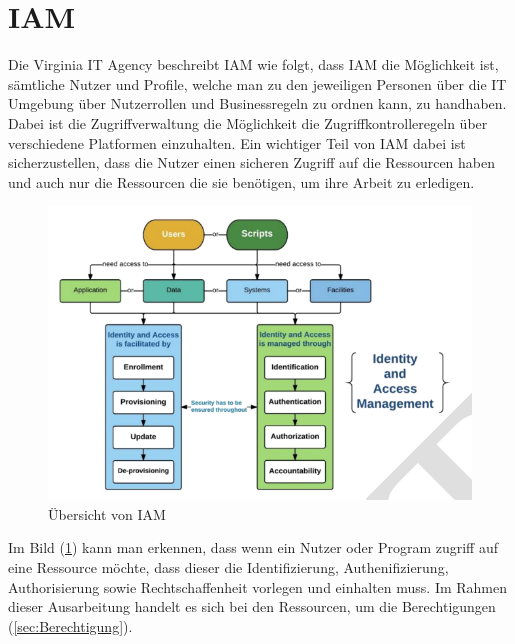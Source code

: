 \section{IAM}
\label{subsec:IAM}
Die Virginia IT Agency beschreibt IAM wie folgt, dass \ac{IAM} die Möglichkeit ist, sämtliche Nutzer und Profile, welche man zu den jeweiligen Personen über die IT Umgebung über Nutzerrollen und Businessregeln zu ordnen kann, zu handhaben. Dabei ist die Zugriffverwaltung die Möglichkeit die Zugriffkontrolleregeln über verschiedene Platformen einzuhalten. Ein wichtiger Teil von \ac{IAM} dabei ist sicherzustellen, dass die Nutzer einen sicheren Zugriff auf die Ressourcen haben und auch nur die Ressourcen die sie benötigen, um ihre Arbeit zu erledigen. \cite{Virg07}
\begin{figure}[h!]
 \centering
 \includegraphics[width=1\textwidth]{gfx/Picture/IAM.PNG}
 \caption{Übersicht von IAM \cite{Moha19}}
 \label{fig:IAM}
\end{figure}
Im Bild (\ref{fig:IAM}) kann man erkennen, dass wenn ein Nutzer oder Program zugriff auf eine Ressource möchte, dass dieser die Identifizierung, Authenifizierung, Authorisierung sowie Rechtschaffenheit vorlegen und einhalten muss. \cite{Moha19}
\newline
Im Rahmen dieser Ausarbeitung handelt es sich bei den Ressourcen, um die Berechtigungen (\ref{sec:Berechtigung}).

